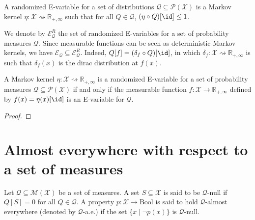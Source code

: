 \begin{definition}\label{def:randEVar}
  \leanok
A randomized E-variable for a set of distributions $\mathcal{Q} \subseteq \mathcal{P}(\mathcal{X})$ is a Markov kernel $\eta : \mathcal{X} \rightsquigarrow \mathbb{R}_{+,\infty}$ such that for all $Q \in \mathcal{Q}$, $(\eta \circ Q)[\id] \le 1$.
\end{definition}

We denote by $\mathcal{E}^R_{\mathcal{Q}}$ the set of randomized E-variables for a set of probability measures $\mathcal{Q}$.
Since measurable functions can be seen as deterministic Markov kernels, we have $\mathcal{E}_{\mathcal{Q}} \subseteq \mathcal{E}^R_{\mathcal{Q}}$.
Indeed, $Q[f] = (\delta_f \circ Q)[\id]$, in which $\delta_f : \mathcal{X} \rightsquigarrow \mathbb{R}_{+,\infty}$ is such that $\delta_f(x)$ is the dirac distribution at $f(x)$.


\begin{lemma}\label{lem:randEVar_iff_eVar}
  \leanok
A Markov kernel $\eta : \mathcal{X} \rightsquigarrow \mathbb{R}_{+,\infty}$ is a randomized E-variable for a set of probability measures $\mathcal{Q} \subseteq \mathcal{P}(\mathcal{X})$ if and only if the measurable function $f : \mathcal{X} \to \mathbb{R}_{+,\infty}$ defined by $f(x) = \eta(x)[\id]$ is an E-variable for $\mathcal{Q}$.
\end{lemma}

\begin{proof}\leanok

\end{proof}




\section{Almost everywhere with respect to a set of measures}

\begin{definition}\label{def:aeSet}
  \leanok
Let $\mathcal{Q} \subseteq \mathcal{M}(\mathcal{X})$ be a set of measures.
A set $S \subseteq \mathcal{X}$ is said to be $\mathcal{Q}$-null if $Q[S] = 0$ for all $Q \in \mathcal{Q}$.
A property $p : \mathcal{X} \to \mathrm{Bool}$ is said to hold $\mathcal{Q}$-almost everywhere (denoted by $\mathcal{Q}$-a.e.) if the set $\{x \mid \neg p(x)\}$ is $\mathcal{Q}$-null.
\end{definition}

